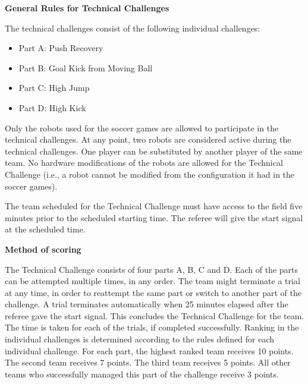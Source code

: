 \clearpage
\sffamily
{\bfseries\color[rgb]{0.4,0.4,0.4}
General Rules for Technical Challenges}
{}

\bigskip

The technical challenges consist of the following individual challenges:

\begin{itemize}
\item Part A: Push Recovery
\item Part B: Goal Kick from Moving Ball
\item Part C: High Jump 
\item Part D: High Kick
\end{itemize}

\bigskip

Only the robots used for the soccer games are allowed to participate in the technical challenges.
At any point, two robots are considered active during the technical challenges.
One player can be substituted by another player of the same team.
No hardware modifications of the robots are allowed for the Technical Challenge
(i.e., a robot cannot be modified from the configuration it had in the soccer games). 

\bigskip

The team scheduled for the Technical Challenge must have access to the field five minutes prior to the scheduled starting time. The referee will give the start signal at the scheduled time.

\bigskip

{\bfseries Method of scoring}

\headlinebox
 
The Technical Challenge consists of four parts A, B, C and D. Each of the parts can be attempted multiple times, in any order. The team might terminate a trial at any time, in order to reattempt the same part or switch to another part of the challenge. A trial terminates automatically when 25 minutes elapsed after the referee gave the start
signal. This concludes the Technical Challenge for the team. The time is taken for each of the trials, if completed successfully. Ranking in the individual challenges is determined according to the rules defined
for each individual challenge. For each part, the highest ranked team receives 10 points. The second team receives 7 points. The third team receives 5 points. All other teams who successfully managed this part of the challenge receive 3 points.


